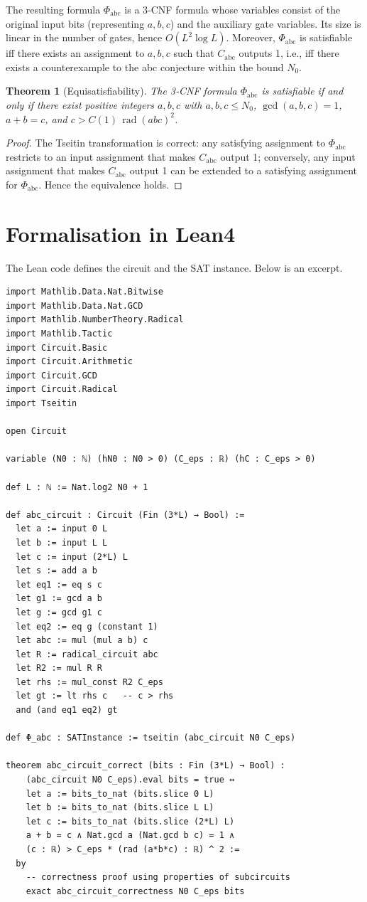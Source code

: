 \documentclass[11pt,a4paper]{article}
\newtheorem{theorem}{Theorem}[section]
\begin{document}
The resulting formula $\Phi_{\text{abc}}$ is a 3‑CNF formula whose variables consist of the original input bits (representing $a,b,c$) and the auxiliary gate variables. Its size is linear in the number of gates, hence $O(L^2 \log L)$. Moreover, $\Phi_{\text{abc}}$ is satisfiable iff there exists an assignment to $a,b,c$ such that $C_{\text{abc}}$ outputs 1, i.e., iff there exists a counterexample to the abc conjecture within the bound $N_0$.

\begin{theorem}[Equisatisfiability]\label{thm:equiv}
The 3‑CNF formula $\Phi_{\text{abc}}$ is satisfiable if and only if there exist positive integers $a,b,c$ with $a,b,c \le N_0$, $\gcd(a,b,c)=1$, $a+b=c$, and $c > C(1)\,\operatorname{rad}(abc)^{2}$.
\end{theorem}
\begin{proof}
The Tseitin transformation is correct: any satisfying assignment to $\Phi_{\text{abc}}$ restricts to an input assignment that makes $C_{\text{abc}}$ output 1; conversely, any input assignment that makes $C_{\text{abc}}$ output 1 can be extended to a satisfying assignment for $\Phi_{\text{abc}}$. Hence the equivalence holds.
\end{proof}

\section{Formalisation in Lean4}

The Lean code defines the circuit and the SAT instance. Below is an excerpt.

\begin{lstlisting}[style=lean, caption={SeriesXIII/AbcCircuit.lean (excerpt)}]
import Mathlib.Data.Nat.Bitwise
import Mathlib.Data.Nat.GCD
import Mathlib.NumberTheory.Radical
import Mathlib.Tactic
import Circuit.Basic
import Circuit.Arithmetic
import Circuit.GCD
import Circuit.Radical
import Tseitin

open Circuit

variable (N0 : ℕ) (hN0 : N0 > 0) (C_eps : ℝ) (hC : C_eps > 0)

def L : ℕ := Nat.log2 N0 + 1

def abc_circuit : Circuit (Fin (3*L) → Bool) :=
  let a := input 0 L
  let b := input L L
  let c := input (2*L) L
  let s := add a b
  let eq1 := eq s c
  let g1 := gcd a b
  let g := gcd g1 c
  let eq2 := eq g (constant 1)
  let abc := mul (mul a b) c
  let R := radical_circuit abc
  let R2 := mul R R
  let rhs := mul_const R2 C_eps
  let gt := lt rhs c   -- c > rhs
  and (and eq1 eq2) gt

def Φ_abc : SATInstance := tseitin (abc_circuit N0 C_eps)

theorem abc_circuit_correct (bits : Fin (3*L) → Bool) :
    (abc_circuit N0 C_eps).eval bits = true ↔
    let a := bits_to_nat (bits.slice 0 L)
    let b := bits_to_nat (bits.slice L L)
    let c := bits_to_nat (bits.slice (2*L) L)
    a + b = c ∧ Nat.gcd a (Nat.gcd b c) = 1 ∧
    (c : ℝ) > C_eps * (rad (a*b*c) : ℝ) ^ 2 :=
  by
    -- correctness proof using properties of subcircuits
    exact abc_circuit_correctness N0 C_eps bits
\end{lstlisting}
\end{document}

